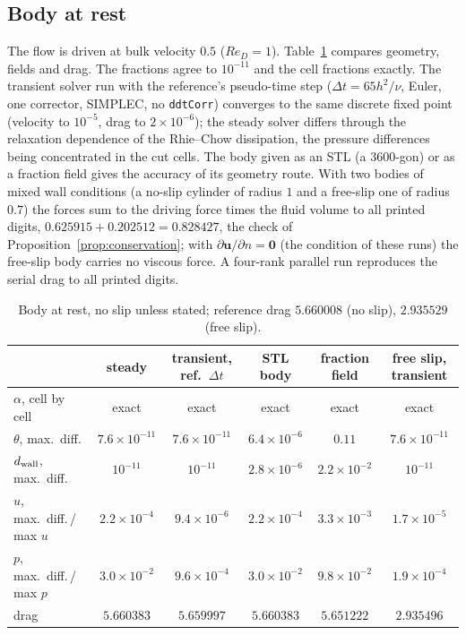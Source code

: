 \documentclass[11pt,a4paper]{article}
\theoremstyle{remark}
\newcommand{\uu}{\bm{u}}
\newcommand{\dt}{\Delta t}
\newcommand{\dw}{d_{\rm wall}}
\newcommand{\code}[1]{\texttt{#1}}
\begin{document}
\subsection{Body at rest}

The flow is driven at bulk velocity $0.5$ ($Re_D=1$). Table~\ref{tab:static_verif} compares
geometry, fields and drag. The fractions agree to $10^{-11}$ and the cell fractions exactly.
The transient solver run with the reference's pseudo-time step ($\dt=65h^2/\nu$, Euler, one
corrector, SIMPLEC, no \code{ddtCorr}) converges to the same discrete fixed point (velocity to
$10^{-5}$, drag to $2\times10^{-6}$); the steady solver differs through the relaxation
dependence of the Rhie--Chow dissipation, the pressure differences being concentrated in the
cut cells. The body given as an STL (a 3600-gon) or as a fraction field gives the accuracy of
its geometry route. With two bodies of mixed wall conditions (a no-slip cylinder of radius $1$
and a free-slip one of radius $0.7$) the forces sum to the driving force times the fluid volume
to all printed digits, $0.625915+0.202512=0.828427$, the check of
Proposition~\ref{prop:conservation}; with $\partial\uu/\partial n=\bm 0$ (the condition of these runs) the
free-slip body carries no viscous force. A four-rank
parallel run reproduces the serial drag to all printed digits.

\begin{table}[htbp]\centering\footnotesize
\caption{Body at rest, no slip unless stated; reference drag $5.660008$ (no slip), $2.935529$
(free slip).}
\label{tab:static_verif}
\setlength{\tabcolsep}{4pt}
\begin{tabular}{@{}lccccc@{}}
\toprule
& steady & transient, ref.\ $\dt$ & STL body & fraction field & free slip, transient\\
\midrule
$\alpha$, cell by cell & exact & exact & exact & exact & exact\\
$\theta$, max.\ diff. & $7.6\times10^{-11}$ & $7.6\times10^{-11}$ & $6.4\times10^{-6}$ & $0.11$ & $7.6\times10^{-11}$\\
$\dw$, max.\ diff. & $10^{-11}$ & $10^{-11}$ & $2.8\times10^{-6}$ & $2.2\times10^{-2}$ & $10^{-11}$\\
$u$, max.\ diff.\,/\,max $u$ & $2.2\times10^{-4}$ & $9.4\times10^{-6}$ & $2.2\times10^{-4}$ & $3.3\times10^{-3}$ & $1.7\times10^{-5}$\\
$p$, max.\ diff.\,/\,max $p$ & $3.0\times10^{-2}$ & $9.6\times10^{-4}$ & $3.0\times10^{-2}$ & $9.8\times10^{-2}$ & $1.9\times10^{-4}$\\
drag & $5.660383$ & $5.659997$ & $5.660383$ & $5.651222$ & $2.935496$\\
\bottomrule
\end{tabular}
\end{table}
\end{document}

